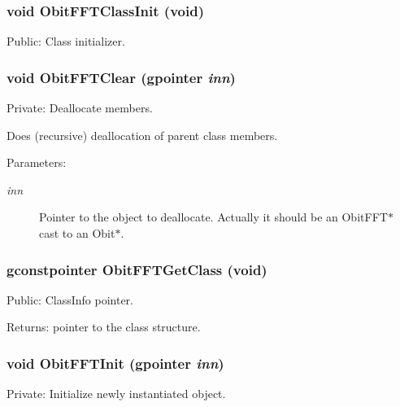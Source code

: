 \subsubsection{\setlength{\rightskip}{0pt plus 5cm}void Obit\-FFTClass\-Init (void)}\label{ObitFFT_8c_a12}


Public: Class initializer. 

\subsubsection{\setlength{\rightskip}{0pt plus 5cm}void Obit\-FFTClear (gpointer {\em inn})}\label{ObitFFT_8c_a4}


Private: Deallocate members. 

Does (recursive) deallocation of parent class members. \begin{Desc}
\item[Parameters:]
\begin{description}
\item[{\em inn}]Pointer to the object to deallocate. Actually it should be an Obit\-FFT$\ast$ cast to an Obit$\ast$. \end{description}
\end{Desc}
\subsubsection{\setlength{\rightskip}{0pt plus 5cm}gconstpointer Obit\-FFTGet\-Class (void)}\label{ObitFFT_8c_a7}


Public: Class\-Info pointer. 

\begin{Desc}
\item[Returns:]pointer to the class structure. \end{Desc}
\subsubsection{\setlength{\rightskip}{0pt plus 5cm}void Obit\-FFTInit (gpointer {\em inn})}\label{ObitFFT_8c_a3}


Private: Initialize newly instantiated object. 

